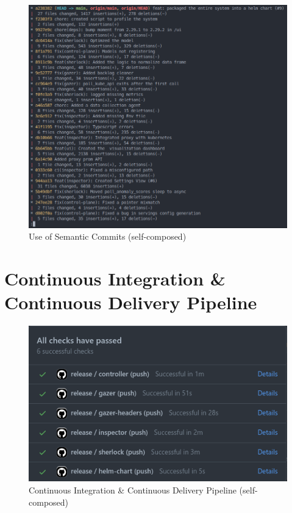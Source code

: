 \begin{figure}[H]
    \includegraphics[width=16.5cm]{assets/appendix/commits.png}
    \caption{Use of Semantic Commits (self-composed)}
\end{figure}


\section{Continuous Integration \& Continuous Delivery Pipeline}

\begin{figure}[H]
    \includegraphics[width=16.5cm]{assets/appendix/ci.png}
    \caption{Continuous Integration \& Continuous Delivery Pipeline (self-composed)}
\end{figure}

